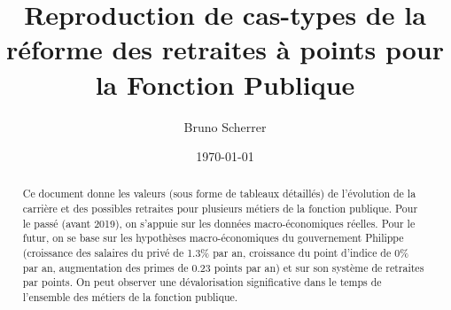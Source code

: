 \documentclass[a4paper,10pt]{report}
\title{Reproduction de cas-types de la réforme des retraites à points pour la Fonction Publique}
\author{Bruno Scherrer}
\date{\today}
\begin{document}
\dominitoc

\maketitle
 
\begin{abstract}
  Ce document donne les valeurs (sous forme de tableaux détaillés) de l'évolution de la carrière et des possibles retraites pour plusieurs métiers de la fonction publique. Pour le passé (avant 2019), on s'appuie sur les données macro-économiques réelles. Pour le futur, on se base sur les hypothèses macro-économiques du gouvernement Philippe (croissance des salaires du privé de 1.3\% par an, croissance du point d'indice de 0\% par an, augmentation des primes de 0.23 points par an) et sur son système de retraites par points. On peut observer une dévalorisation significative dans le temps de l'ensemble des métiers de la fonction publique.
\end{abstract}

\setcounter{tocdepth}{0}
\tableofcontents

\setcounter{tocdepth}{1}

\end{document}
